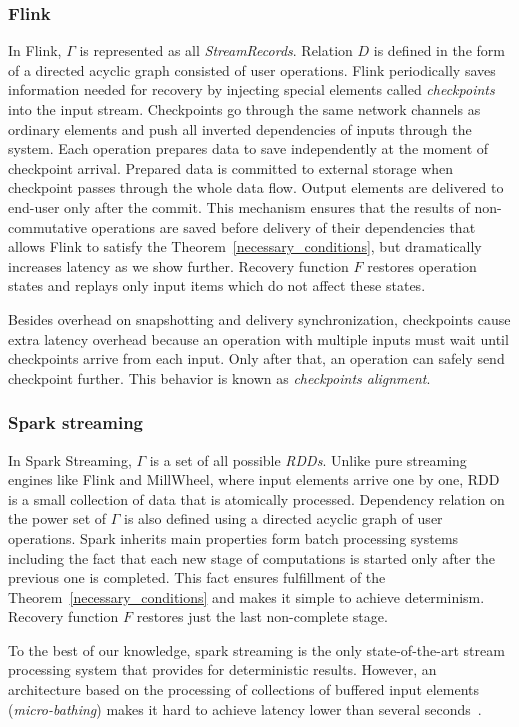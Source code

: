 \subsubsection{Flink}

In Flink, $\Gamma$ is represented as all {\em StreamRecords}. Relation $D$ is defined in the form of a directed acyclic graph consisted of user operations. Flink periodically saves information needed for recovery by injecting special elements called {\em checkpoints} into the input stream. Checkpoints go through the same network channels as ordinary elements and push all inverted dependencies of inputs through the system. Each operation prepares data to save independently at the moment of checkpoint arrival. Prepared data is committed to external storage when checkpoint passes through the whole data flow. Output elements are delivered to end-user only after the commit. This mechanism ensures that the results of non-commutative operations are saved before delivery of their dependencies that allows Flink to satisfy the Theorem~\ref{necessary_conditions}, but dramatically increases latency as we show further. Recovery function $F$ restores operation states and replays only input items which do not affect these states.

Besides overhead on snapshotting and delivery synchronization, checkpoints cause extra latency overhead because an operation with multiple inputs must wait until checkpoints arrive from each input. Only after that, an operation can safely send checkpoint further. This behavior is known as {\em checkpoints alignment}.

\subsubsection{Spark streaming}

In Spark Streaming, $\Gamma$ is a set of all possible {\em RDDs}. Unlike pure streaming engines like Flink and MillWheel, where input elements arrive one by one, RDD is a small collection of data that is atomically processed. Dependency relation on the power set of $\Gamma$ is also defined using a directed acyclic graph of user operations. Spark inherits main properties form batch processing systems including the fact that each new stage of computations is started only after the previous one is completed. This fact ensures fulfillment of the Theorem~\ref{necessary_conditions} and makes it simple to achieve determinism. Recovery function $F$ restores just the last non-complete stage.
 
To the best of our knowledge, spark streaming is the only state-of-the-art stream processing system that provides for deterministic results. However, an architecture based on the processing of collections of buffered input elements ({\em micro-bathing}) makes it hard to achieve latency lower than several seconds~\cite{7530084, 7474816}. 
